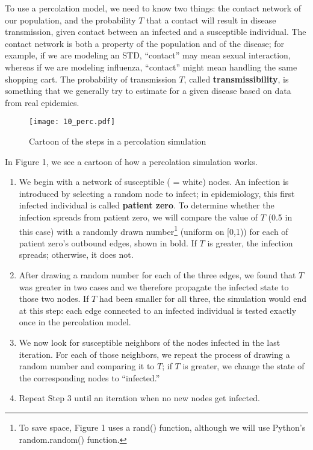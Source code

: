 \documentclass{article}
\begin{document}
To use a percolation model, we need to know two things: the contact network of
our population, and the probability $T$ that a contact will result in disease
transmission, given contact between an infected and a susceptible individual. 
The contact network is both a property of the population and of the disease; for
example, if we are modeling an STD, ``contact'' may mean sexual interaction,
whereas if we are modeling influenza, ``contact'' might mean handling the same
shopping cart.  The probability of transmission $T$, called
\textbf{transmissibility}, is something that we generally try to estimate for a
given disease based on data from real epidemics.

\pagebreak

\begin{figure}[h]
\begin{center}
\texttt{[image: 10\_perc.pdf]}
\caption{Cartoon of the steps in a percolation simulation}
\end{center}
\end{figure}

In Figure 1, we see a cartoon of how a percolation simulation works.  
\begin{enumerate}
 \item[Step 1] We begin with a network of susceptible ( = white) nodes.  An
infection is introduced by selecting a random node to infect; in epidemiology,
this first infected individual is called \textbf{patient zero}.  To determine
whether the infection spreads from patient zero, we will compare the value of
$T$ (0.5 in this case) with a randomly drawn number\footnote{To save space,
Figure 1 uses a rand() function, although we will use Python's
random.random() function.} (uniform on [0,1)) for each of patient zero's
outbound edges, shown in bold.  If $T$ is greater, the infection spreads;
otherwise, it does not.
 \item[Step 2] After drawing a random number for each of the three edges, we
found that $T$ was greater in two cases and we therefore propagate the infected
state to those two nodes.  If $T$ had been smaller for all three, the simulation
would end at this step: each edge connected to an infected individual is tested
exactly once in the percolation model.
 \item[Step 3] We now look for susceptible neighbors of the nodes infected in
the last iteration.  For each of those neighbors, we repeat the process of
drawing a random number and comparing it to $T$; if $T$ is greater, we change
the state of the corresponding nodes to ``infected.''
 \item[Step 4] Repeat Step 3 until an iteration when no new nodes get infected.
\end{enumerate}
\end{document}
